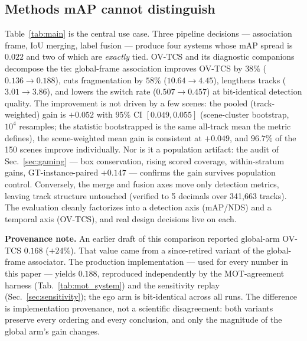 \documentclass[10pt,twocolumn,letterpaper]{article}
\begin{document}
\subsection{Methods mAP cannot distinguish}
Table~\ref{tab:main} is the central use case. Three pipeline decisions ---
association frame, IoU merging, label fusion --- produce four systems whose
mAP spread is $0.022$ and two of which are \emph{exactly} tied. OV-TCS and
its diagnostic companions decompose the tie: global-frame association
improves OV-TCS by $38\%$ ($0.136\!\to\!0.188$), cuts fragmentation by
$58\%$ ($10.64\!\to\!4.45$), lengthens tracks ($3.01\!\to\!3.86$), and lowers
the switch rate ($0.507\!\to\!0.457$) at bit-identical detection quality. The
improvement is not driven by a few scenes: the pooled (track-weighted) gain
is $+0.052$ with $95\%$ CI $[0.049, 0.055]$ (scene-cluster bootstrap, $10^4$
resamples; the statistic bootstrapped is the same all-track mean the metric
defines), the scene-weighted mean gain is consistent at $+0.049$, and
$96.7\%$ of the 150 scenes improve individually. Nor is it a population
artifact: the audit of Sec.~\ref{sec:gaming} --- box conservation, rising
scored coverage, within-stratum gains, GT-instance-paired $+0.147$ ---
confirms the gain survives population control. Conversely, the merge and
fusion axes move only detection metrics, leaving track structure untouched
(verified to 5 decimals over 341{,}663 tracks). The evaluation cleanly
factorizes into a detection axis (mAP/NDS) and a temporal axis (OV-TCS), and
real design decisions live on each.

\noindent\textbf{Provenance note.} An earlier draft of this comparison
reported global-arm OV-TCS $0.168$ ($+24\%$). That value came from a
since-retired variant of the global-frame associator. The production
implementation --- used for every number in this paper --- yields $0.188$,
reproduced independently by the MOT-agreement harness
(Tab.~\ref{tab:mot_system}) and the sensitivity replay
(Sec.~\ref{sec:sensitivity}); the ego arm is bit-identical across all runs.
The difference is implementation provenance, not a scientific disagreement:
both variants preserve every ordering and every conclusion, and only the
magnitude of the global arm's gain changes.
\end{document}
